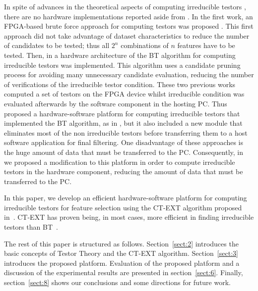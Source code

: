 \documentclass[authoryear,preprint,review,12pt]{elsarticle}
\begin{document}
In spite of advances in the theoretical aspects of computing
irreducible testors \citep{R5,R8,R9}, there are 
no hardware implementations reported aside from \citep{R10,R11,R21}.
In the first work, an FPGA-based brute force approach for computing testors was proposed
\citep{R10}. This first approach did not take advantage of dataset characteristics to reduce the number 
of candidates to be tested; thus all $2^n$ combinations of $n$ features have to be tested. 
Then, in \citep{R11} a hardware architecture of the BT algorithm for computing irreducible testors was implemented. 
This algorithm uses a candidate pruning process for avoiding many unnecessary candidate evaluation, 
reducing the number of verifications of the irreducible testor condition. 
These two previous works computed a set of testors on the FPGA device whilst irreducible condition 
was evaluated afterwards by the software component in the hosting PC. 
Thus \cite{R21} proposed a hardware-software platform for computing irreducible testors that 
implemented the BT algorithm, as in \citep{R11}, but it also included a new module that eliminates most of 
the non irreducible testors before transferring them to a host software application for final filtering. 
One disadvantage of these approaches is the huge amount of data that must be transferred to the PC.  
Consequently, in~\citep{Rod14} we proposed a modification to this platform in order to compute irreducible 
testors in the hardware component, reducing the amount of data that must be transferred to the PC. 



In this paper, we develop an efficient hardware-software platform for computing irreducible
testors for feature selection using the CT-EXT algorithm proposed in~\citep{R22}. 
CT-EXT has proven being, in most cases, more efficient in finding irreducible testors than BT~\citep{R22, R23}.


The rest of this paper is structured as follows. Section~\ref{sect:2} introduces the basic concepts of 
Testor Theory and the CT-EXT algorithm. Section~\ref{sect:3} introduces the proposed platform.  
Evaluation of the proposed platform and a discussion of the experimental results are 
presented in section~\ref{sect:6}. Finally, section~\ref{sect:8} shows our conclusions and some directions 
for future work.
\end{document}

